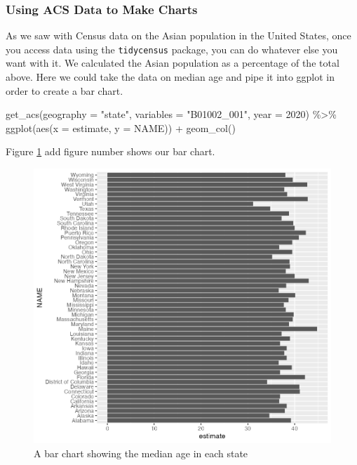 \documentclass[
]{book}
\newenvironment{Shaded}{\begin{snugshade}}{\end{snugshade}}
\newcommand{\AttributeTok}[1]{\textcolor[rgb]{0.77,0.63,0.00}{#1}}
\newcommand{\DecValTok}[1]{\textcolor[rgb]{0.00,0.00,0.81}{#1}}
\newcommand{\FunctionTok}[1]{\textcolor[rgb]{0.00,0.00,0.00}{#1}}
\newcommand{\NormalTok}[1]{#1}
\newcommand{\SpecialCharTok}[1]{\textcolor[rgb]{0.00,0.00,0.00}{#1}}
\newcommand{\StringTok}[1]{\textcolor[rgb]{0.31,0.60,0.02}{#1}}
\begin{document}
\hypertarget{using-acs-data-to-make-charts}{%
\subsubsection*{Using ACS Data to Make Charts}\label{using-acs-data-to-make-charts}}

As we saw with Census data on the Asian population in the United States, once you access data using the \texttt{tidycensus} package, you can do whatever else you want with it. We calculated the Asian population as a percentage of the total above. Here we could take the data on median age and pipe it into ggplot in order to create a bar chart.

\begin{Shaded}
\begin{Highlighting}[]
\FunctionTok{get\_acs}\NormalTok{(}\AttributeTok{geography =} \StringTok{"state"}\NormalTok{,}
        \AttributeTok{variables =} \StringTok{"B01002\_001"}\NormalTok{,}
        \AttributeTok{year =} \DecValTok{2020}\NormalTok{) }\SpecialCharTok{\%\textgreater{}\%} 
  \FunctionTok{ggplot}\NormalTok{(}\FunctionTok{aes}\NormalTok{(}\AttributeTok{x =}\NormalTok{ estimate,}
             \AttributeTok{y =}\NormalTok{ NAME)) }\SpecialCharTok{+}
  \FunctionTok{geom\_col}\NormalTok{()}
\end{Highlighting}
\end{Shaded}

Figure \ref{fig:median-age-chart} add figure number shows our bar chart.

\begin{figure}
\includegraphics[width=1\linewidth]{tidycensus_files/figure-latex/median-age-chart-1} \caption{A bar chart showing the median age in each state}\label{fig:median-age-chart}
\end{figure}
\end{document}
